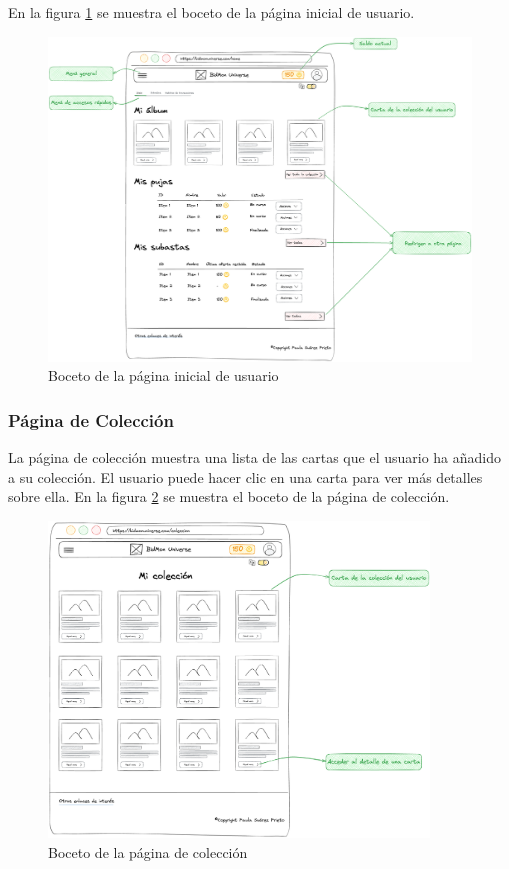 En la figura \ref{fig:p_user_home} se muestra el boceto de la página inicial de usuario.

\begin{figure}[H]
    \centering
    \includegraphics[width=1\textwidth]{figures/6-Analisis/6-Interfaz/prototipos/home-logueada.png}
    \caption{Boceto de la página inicial de usuario}
    \label{fig:p_user_home}
\end{figure}

\subsubsection{Página de Colección}
La página de colección muestra una lista de las cartas que el usuario ha añadido a su colección.
El usuario puede hacer clic en una carta para ver más detalles sobre ella.
En la figura \ref{fig:p_collection} se muestra el boceto de la página de colección.
\begin{figure}[H]
    \centering
    \includegraphics[width=0.9\textwidth]{figures/6-Analisis/6-Interfaz/prototipos/coleccion.png}
    \caption{Boceto de la página de colección}
    \label{fig:p_collection}
\end{figure}

